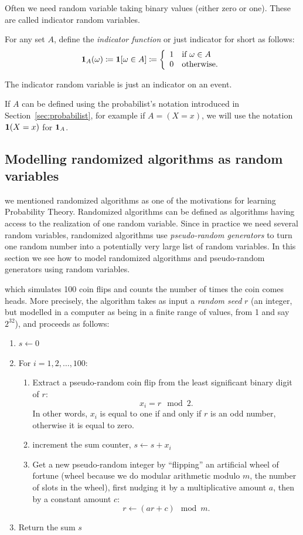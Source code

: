 \documentclass{article}
\begin{document}
Often we need random variable taking binary values (either zero or one). These are called indicator random variables. 

For any set $A$, define the \emph{indicator function} or just indicator for short as follows: \[ {\mathbf 1}_A(\omega) \coloneqq {\mathbf 1}[\omega \in A] \coloneqq \left\{ \begin{array}{ll} 1 &\text{if }\omega\in A\\0&\text{otherwise.} \end{array} \right. \]

The indicator random variable is just an indicator on an event.

If $A$ can be defined using the probabilist's notation introduced in Section~\ref{sec:probabilist}, for example if $A = (X = x)$, we will use the notation ${\mathbf 1}(X = x)$ for ${\mathbf 1}_A$.


\subsection{Modelling randomized algorithms as random variables}

 we mentioned randomized algorithms as one of the motivations for learning Probability Theory. Randomized algorithms can be defined as algorithms having  access to the realization of one random variable. Since in practice we need several random variables, randomized algorithms use \emph{pseudo-random generators} to turn one random number into a potentially very large list of random variables. In this section we see how to model randomized algorithms and pseudo-random generators using random variables. 

 which simulates 100 coin flips and counts the number of times the coin comes heads. More precisely, the algorithm takes as input a \emph{random seed} $r$ (an integer, but modelled in a computer as being in a finite range of values, from 1 and say $2^{32}$), and proceeds as follows:

\begin{enumerate}
	\item $s \gets 0$
	\item For $i = 1, 2, \dots, 100$:
	\begin{enumerate}
		\item Extract a pseudo-random coin flip from the least significant binary digit of $r$: \[x_i = r \mod 2.\]
		In other words, $x_i$ is equal to one if and only if $r$ is an odd number, otherwise it is equal to zero.
		\item increment the sum counter, $s \gets s + x_i$
		\item Get a new pseudo-random integer by ``flipping'' an artificial wheel of fortune (wheel because we do modular arithmetic modulo $m$, the number of slots in the wheel), first nudging it
		by a multiplicative amount $a$, then by a constant amount $c$:
		\[ r \gets (a r + c) \mod m.\]
	\end{enumerate}
	\item Return the sum $s$
\end{enumerate}
\end{document}
